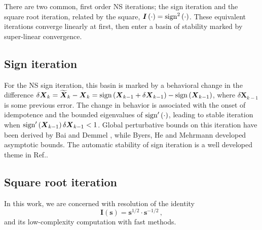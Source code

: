 \documentclass[letterpaper,twocolumn,amsmath,amsfont,amssymb,english,aps,jcp,preprintnumbers,groupaddress,nofootinbib,tightenlines,floatfix]{revtex4}
\newcommand{\mat}[1]{\boldsymbol{#1}}
\theoremstyle{plain}
\theoremstyle{remark}
\theoremstyle{plain}
\begin{document}
There are two common, first order NS iterations; the sign iteration
and the square root iteration, related by the square, $\mat{I}\left(
\cdot \right)= {\rm sign}^2\left( \cdot \right) $.  These equivalent
iterations converge linearly at first, then enter a basin of stability
marked by super-linear convergence.  

\subsection{Sign iteration}

For the NS sign iteration, this basin is marked by a behavioral change
in the difference $\delta \mat{X}_k = \widetilde{\mat{X}}_k -\mat{X}_k
= {\rm sign} \left(\mat{X}_{k-1}+\delta \mat{X}_{k-1} \right) -{\rm
  sign} \left(\mat{X}_{k-1} \right)$, where $\delta \mat{X}_{k-1}$ is
some previous error.  The change in behavior is associated with the
onset of idempotence and the bounded eigenvalues of ${\rm sign}'\left(
\cdot \right)$, leading to stable iteration when ${\rm sign}'\left(
\mat{X}_{k-1} \right) \delta \mat{X}_{k-1} < 1 $.  Global perturbative
bounds on this iteration have been derived by Bai and Demmel
\cite{Bai98usingthe}, while Byers, He and Mehrmann \cite{} developed
asymptotic bounds.  The automatic stability of sign iteration is a
well developed theme in Ref.\cite{Higham08}.

\subsection{Square root iteration}
In this work, we are concerned with resolution of the identity
\begin{equation}
\mat{I} \left( \mat{s} \right) =\mat{s}^{1/2} \cdot \mat{s}^{-1/2} \, ,
\end{equation}
and its low-complexity computation with fast methods.  
\end{document}
